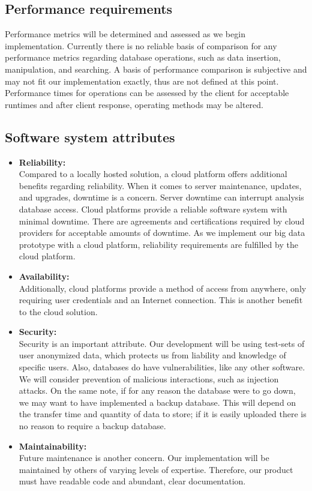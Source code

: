 	\subsection{Performance requirements}
        Performance metrics will be determined and assessed as we begin implementation. Currently there is no reliable basis of comparison for any performance metrics regarding database operations, such as data insertion, manipulation, and searching. A basis of performance comparison is subjective and may not fit our implementation exactly, thus are not defined at this point. Performance times for operations can be assessed by the client for acceptable runtimes and after client response, operating methods may be altered.
        
 	\subsection{Software system attributes}
 		\begin{itemize}
        \item{\textbf{Reliability:}}\\
        Compared to a locally hosted solution, a cloud platform offers additional benefits regarding reliability. When it comes to server maintenance, updates, and upgrades, downtime is a concern. Server downtime can interrupt analysis database access. Cloud platforms provide a reliable software system with minimal downtime\cite{AWS Rate}. There are agreements and certifications required by cloud providers\cite{Cloud} for acceptable amounts of downtime. As we implement our big data prototype with a cloud platform, reliability requirements are fulfilled by the cloud platform.\\
       
        \item{\textbf{Availability:}}\\
        Additionally, cloud platforms provide a method of access from anywhere, only requiring user credentials and an Internet connection. This is another benefit to the cloud solution.\\
   
        \item{\textbf{Security:}}\\
        Security is an important attribute. Our development will be using test-sets of user anonymized data, which protects us from liability and knowledge of specific users. Also, databases do have vulnerabilities, like any other software. We will consider prevention of malicious interactions, such as injection attacks. On the same note, if for any reason the database were to go down, we may want to have implemented a backup database. This will depend on the transfer time and quantity of data to store; if it is easily uploaded there is no reason to require a backup database.\\
     
        \item{\textbf{Maintainability:}}\\
        Future maintenance is another concern. Our implementation will be maintained by others of varying levels of expertise. Therefore, our product must have readable code and abundant, clear documentation.
    	\end{itemize}